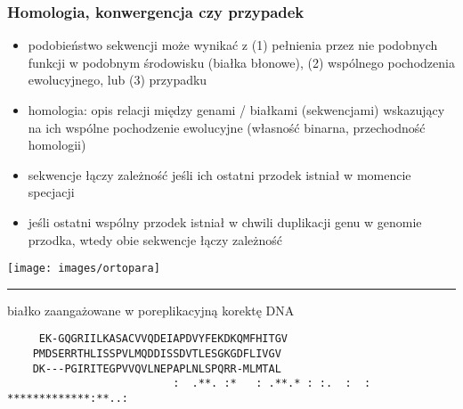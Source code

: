 \begin{frame}[fragile]
\frametitle{Homologia, konwergencja czy przypadek}
\noindent\begin{minipage}[c]{.4\textwidth}
\raggedright{}
\begin{itemize}
 \item podobieństwo sekwencji może wynikać z (1) pełnienia przez nie
 podobnych funkcji w podobnym środowisku (białka błonowe), (2)
 wspólnego pochodzenia ewolucyjnego, lub (3) przypadku

 \item homologia: opis relacji między genami / białkami (sekwencjami)
 wskazujący na ich wspólne pochodzenie ewolucyjne (własność binarna,
 przechodność homologii)
 
 \item sekwencje  łączy zależność 
 jeśli ich ostatni przodek istniał w momencie specjacji

 \item jeśli ostatni wspólny przodek istniał w chwili duplikacji genu w
 genomie przodka, wtedy obie sekwencje łączy zależność 
 
\end{itemize}
\end{minipage}\vspace{.01\textwidth}%
\begin{minipage}[c]{.59\textwidth}
\texttt{[image: images/ortopara]}
\end{minipage}
\hrule

\begin{center}
białko zaangażowane w poreplikacyjną korektę DNA

\vspace*{2em}\begin{minipage}{.8\textwidth}
\tiny\texttt{%
~~~~EK-{}GQGRIILKASACVVQDEIAPDVYFEKDKQMFHITGV~\\
~~~~PMDSERRTHLISSPVLMQDDISSDVTLESGKGDFLIVGV~\\
~~~~DK-{}-{}-{}PGIRITEGPVVQVLNEPAPLNLSPQRR-{}MLMTAL~}\\
\verb|                          :  .**. :*   : .**.* : :.  :  : *************:**..:|
\end{minipage}
\end{center}
\end{frame}

